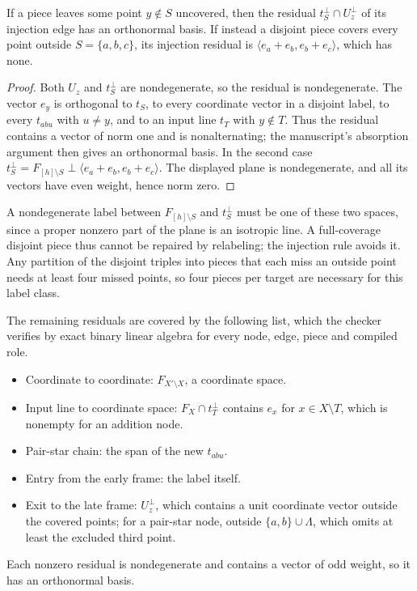 \begin{lemma}\label{lem:complex-piece-residual}
If a piece leaves some point $y\notin S$ uncovered, then the residual
$t_S^\perp\cap U_z^\perp$ of its injection edge has an orthonormal basis.
If instead a disjoint piece covers every point outside $S=\{a,b,c\}$, its
injection residual is $\langle e_a+e_b,e_b+e_c\rangle$, which has none.
\end{lemma}
\begin{proof}
Both $U_z$ and $t_S^\perp$ are nondegenerate, so the residual is
nondegenerate. The vector $e_y$ is orthogonal to $t_S$, to every coordinate
vector in a disjoint label, to every $t_{abu}$ with $u\ne y$, and to an
input line $t_T$ with $y\notin T$. Thus the residual contains a vector of norm
one and is nonalternating; the manuscript's absorption argument then gives
an orthonormal basis. In the second case
$t_S^\perp=F_{[h]\setminus S}\mathbin\perp\langle e_a+e_b,e_b+e_c\rangle$.
The displayed plane is nondegenerate, and all its vectors have even weight,
hence norm zero.
\end{proof}

A nondegenerate label between $F_{[h]\setminus S}$ and $t_S^\perp$ must be
one of these two spaces, since a proper nonzero part of the plane is an
isotropic line. A full-coverage disjoint piece thus cannot be repaired by
relabeling; the injection rule avoids it. Any partition of the disjoint
triples into pieces that each miss an outside point needs at least four
missed points, so four pieces per target are necessary for this label class.

The remaining residuals are covered by the following list, which the checker
verifies by exact binary linear algebra for every node, edge, piece and
compiled role.
\begin{itemize}
\item Coordinate to coordinate: $F_{X'\setminus X}$, a coordinate space.
\item Input line to coordinate space: $F_X\cap t_T^\perp$ contains $e_x$ for
 $x\in X\setminus T$, which is nonempty for an addition node.
\item Pair-star chain: the span of the new $t_{abu}$.
\item Entry from the early frame: the label itself.
\item Exit to the late frame: $U_z^\perp$, which contains a unit coordinate
 vector outside the covered points; for a pair-star node, outside
 $\{a,b\}\cup\Lambda$, which omits at least the excluded third point.
\end{itemize}
Each nonzero residual is nondegenerate and contains a vector of odd weight,
so it has an orthonormal basis.

